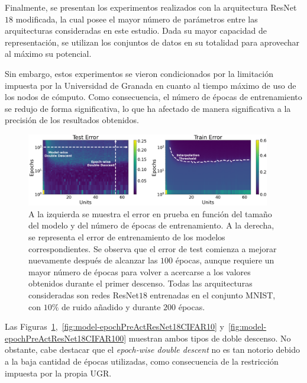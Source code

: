 Finalmente, se presentan los experimentos realizados con la arquitectura ResNet$18$ modificada, la cual posee el mayor número de parámetros entre las arquitecturas consideradas en este estudio. Dada su mayor capacidad de representación, se utilizan los conjuntos de datos en su totalidad para aprovechar al máximo su potencial.

Sin embargo, estos experimentos se vieron condicionados por la limitación impuesta por la Universidad de Granada en cuanto al tiempo máximo de uso de los nodos de cómputo. Como consecuencia, el número de épocas de entrenamiento se redujo de forma significativa, lo que ha afectado de manera significativa a la precisión de los resultados obtenidos.

\begin{figure}[h]
    \centering
    \includegraphics[width=0.95\textwidth]{img/experiments/model-epochPreActResNet18MNIST.png}
    \caption[Doble descenso en función del tamaño del modelo y del número de épocas para la red ResNet$18$ y el conjunto MNIST.]{A la izquierda se muestra el error en prueba en función del tamaño del modelo y del número de épocas de entrenamiento. A la derecha, se representa el error de entrenamiento de los modelos correspondientes. Se observa que el error de test comienza a mejorar nuevamente después de alcanzar las $100$ épocas, aunque requiere un mayor número de épocas para volver a acercarse a los valores obtenidos durante el primer descenso. Todas las arquitecturas consideradas son redes ResNet$18$ entrenadas en el conjunto MNIST, con $10\%$ de ruido añadido y durante $200$ épocas.}\label{fig:model-epochPreActResNet18MNIST}
\end{figure}

Las Figuras~\ref{fig:model-epochPreActResNet18MNIST},~\ref{fig:model-epochPreActResNet18CIFAR10} y~\ref{fig:model-epochPreActResNet18CIFAR100} muestran ambos tipos de doble descenso. No obstante, cabe destacar que el \textit{epoch-wise double descent} no es tan notorio debido a la baja cantidad de épocas utilizadas, como consecuencia de la restricción impuesta por la propia UGR.

